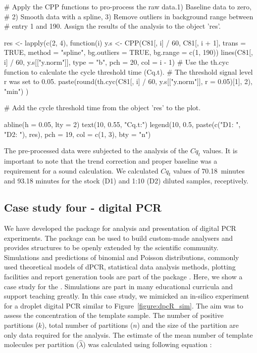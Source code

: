 \begin{example}
# Apply the CPP functions to pro-process the raw data.1) Baseline data to zero, 
# 2) Smooth data with a spline, 3) Remove outliers in background range between 
# entry 1 and 190. Assign the results of the analysis to the object 'res'.

res <- lapply(c(2, 4), function(i) {
  y.s <- CPP(C81[, i] / 60, C81[, i + 1],
             trans = TRUE, 
             method = "spline",
             bg.outliers = TRUE,
             bg.range = c(1, 190))
  lines(C81[, i] / 60, y.s[["y.norm"]], type = "b", pch = 20, col = i - 1)
  # Use the th.cyc function to calculate the cycle threshold time (Cq.t). 
  # The threshold signal level r was set to 0.05.
  paste(round(th.cyc(C81[, i] / 60, y.s[["y.norm"]], r = 0.05)[1], 2), "min")
})

# Add the cycle threshold time from the object 'res' to the plot.

abline(h = 0.05, lty = 2)
text(10, 0.55, "Cq.t:")
legend(10, 0.5, paste(c("D1: ", "D2: "), res), pch = 19, col = c(1, 3), 
       bty = "n")
\end{example}

The pre-processed data were subjected to the analysis of the $Cq_{t}$ values. 
It is important to note that the trend correction and proper baseline was a 
requirement for a sound calculation. We calculated $Cq_{t}$ values of 
70.18~minutes and 93.18 minutes for the stock (D1) and 1:10 (D2) diluted 
samples, receptively.

\subsection{Case study four - digital PCR}

We have developed the  package for analysis and presentation of 
digital PCR experiments. The  package can be used to build 
custom-made analysers and provides structures to be openly extended by the 
scientific community. Simulations and predictions of binomial and Poisson 
distributions, commonly used theoretical models of dPCR, statistical data 
analysis methods, plotting facilities and report generation tools are part of 
the package \citep{pabinger_2014}. Here, we show a case study for the 
. Simulations are part in many educational curricula and support 
teaching greatly. In this case study, we mimicked an in-silico experiment for a 
droplet digital PCR similar to Figure~\ref{figure:dpcR_sim}. The aim was to 
assess the concentration of the template sample. The number of positive 
partitions ($k$), total number of partitions ($n$) and the size of the 
partition 
are only data required for the analysis. The estimate of the mean number of 
template molecules per partition ($\hat \lambda$) was calculated using 
following 
equation \citep{huggett_2013}:


